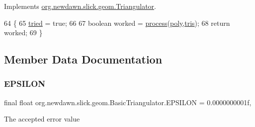 Implements \mbox{\hyperlink{interfaceorg_1_1newdawn_1_1slick_1_1geom_1_1_triangulator_a7c7ce8f59679b6c759a1e3d15ec4ee92}{org.\+newdawn.\+slick.\+geom.\+Triangulator}}.


\begin{DoxyCode}
64                                  \{
65         \mbox{\hyperlink{classorg_1_1newdawn_1_1slick_1_1geom_1_1_basic_triangulator_adc09d95b55a0bca60e6d63df97735ce4}{tried}} = \textcolor{keyword}{true};
66         
67         \textcolor{keywordtype}{boolean} worked = \mbox{\hyperlink{classorg_1_1newdawn_1_1slick_1_1geom_1_1_basic_triangulator_aeb17bc079c7be974c5578b194b57eaf1}{process}}(\mbox{\hyperlink{classorg_1_1newdawn_1_1slick_1_1geom_1_1_basic_triangulator_ae57823930e5e5413052560e8c85eb92a}{poly}},\mbox{\hyperlink{classorg_1_1newdawn_1_1slick_1_1geom_1_1_basic_triangulator_af35de217f51e551e95179a91b06c59f2}{tris}});
68         \textcolor{keywordflow}{return} worked;
69     \}
\end{DoxyCode}


\subsection{Member Data Documentation}
\mbox{\label{classorg_1_1newdawn_1_1slick_1_1geom_1_1_basic_triangulator_a6b5863b9215cbeab694b29c41e697110}} 
\subsubsection{\texorpdfstring{E\+P\+S\+I\+L\+ON}{EPSILON}}
{\footnotesize\ttfamily final float org.\+newdawn.\+slick.\+geom.\+Basic\+Triangulator.\+E\+P\+S\+I\+L\+ON = 0.\+0000000001f\hspace{0.3cm}{\ttfamily [static]}, {\ttfamily [private]}}

The accepted error value \mbox{\label{classorg_1_1newdawn_1_1slick_1_1geom_1_1_basic_triangulator_ae57823930e5e5413052560e8c85eb92a}} 
